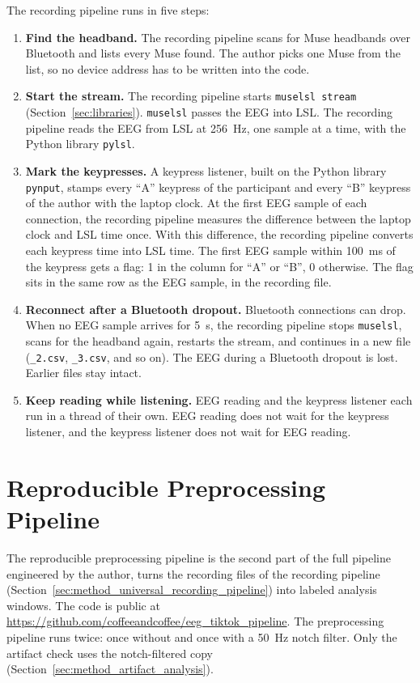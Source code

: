 \documentclass[12pt,a4paper]{report}
\begin{document}
The recording pipeline runs in five steps:
\begin{enumerate}
    \item \textbf{Find the headband.} The recording pipeline scans for Muse headbands over Bluetooth and lists every Muse found. The author picks one Muse from the list, so no device address has to be written into the code.
    \item \textbf{Start the stream.} The recording pipeline starts \texttt{muselsl stream} (Section~\ref{sec:libraries}). \texttt{muselsl} passes the EEG into LSL. The recording pipeline reads the EEG from LSL at 256~Hz, one sample at a time, with the Python library \texttt{pylsl}.
    \item \textbf{Mark the keypresses.} A keypress listener, built on the Python library \texttt{pynput}, stamps every ``A'' keypress of the participant and every ``B'' keypress of the author with the laptop clock. At the first EEG sample of each connection, the recording pipeline measures the difference between the laptop clock and LSL time once. With this difference, the recording pipeline converts each keypress time into LSL time. The first EEG sample within 100~ms of the keypress gets a flag: 1 in the column for ``A'' or ``B'', 0 otherwise. The flag sits in the same row as the EEG sample, in the recording file.
    \item \textbf{Reconnect after a Bluetooth dropout.} Bluetooth connections can drop. When no EEG sample arrives for 5~s, the recording pipeline stops \texttt{muselsl}, scans for the headband again, restarts the stream, and continues in a new file (\texttt{\_2.csv}, \texttt{\_3.csv}, and so on). The EEG during a Bluetooth dropout is lost. Earlier files stay intact.
    \item \textbf{Keep reading while listening.} EEG reading and the keypress listener each run in a thread of their own. EEG reading does not wait for the keypress listener, and the keypress listener does not wait for EEG reading.
\end{enumerate}

\section{Reproducible Preprocessing Pipeline}
\label{sec:method_universal_preprocessing_pipeline}

The reproducible preprocessing pipeline is the second part of the full pipeline engineered by the author, turns the recording files of the recording pipeline (Section~\ref{sec:method_universal_recording_pipeline}) into labeled analysis windows. The code is public at \url{https://github.com/coffeeandcoffee/eeg_tiktok_pipeline}. The preprocessing pipeline runs twice: once without and once with a 50~Hz notch filter. Only the artifact check uses the notch-filtered copy (Section~\ref{sec:method_artifact_analysis}).
\end{document}
